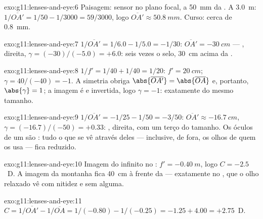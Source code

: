 \begin{solution}{exo:g11:lenses-and-eye:6}
Paisagem: sensor no plano focal, a \qty{50}{mm} da . A \qty{3.0}{m}:
$1/\overline{OA'} = 1/50 - 1/3000 = 59/3000$, logo
$\overline{OA'} \approx \qty{50.8}{mm}$. Curso: cerca de \qty{0.8}{mm}.
\end{solution}

\begin{solution}{exo:g11:lenses-and-eye:7}
$1/\overline{OA'} = 1/6.0 - 1/5.0 = -1/30$:
$\overline{OA'} = \qty{-30}{cm}$ --- , direita,
$\gamma = (-30)/(-5.0) = +6.0$: seis vezes o selo, \qty{30}{cm} acima da
.
\end{solution}

\begin{solution}{exo:g11:lenses-and-eye:8}
$1/f' = 1/40 + 1/40 = 1/20$: $f' = \qty{20}{cm}$;
$\gamma = 40/(-40) = -1$. A simetria obriga
$\abs{\overline{OA'}} = \abs{\overline{OA}}$ e, portanto,
$\abs{\gamma} = 1$; a imagem é  e invertida, logo $\gamma = -1$:
exatamente do mesmo tamanho.
\end{solution}

\begin{solution}{exo:g11:lenses-and-eye:9}
$1/\overline{OA'} = -1/25 - 1/50 = -3/50$:
$\overline{OA'} \approx \qty{-16.7}{cm}$,
$\gamma = (-16.7)/(-50) = +0.33$: , direita, com um terço do
tamanho. Os óculos de um  são : tudo o que se vê através
deles --- inclusive, de fora, os olhos de quem os usa --- fica reduzido.
\end{solution}

\begin{solution}{exo:g11:lenses-and-eye:10}
Imagem do infinito no : $f' = \qty{-0.40}{m}$, logo
$C = -2.5$~D. A imagem da montanha fica \qty{40}{cm} à frente da 
--- exatamente no , que o olho relaxado vê com nitidez e sem
 alguma.
\end{solution}

\begin{solution}{exo:g11:lenses-and-eye:11}
$C = 1/\overline{OA'} - 1/\overline{OA} = 1/(-0.80) - 1/(-0.25)
= -1.25 + 4.00 = +2.75$~D.
\end{solution}

